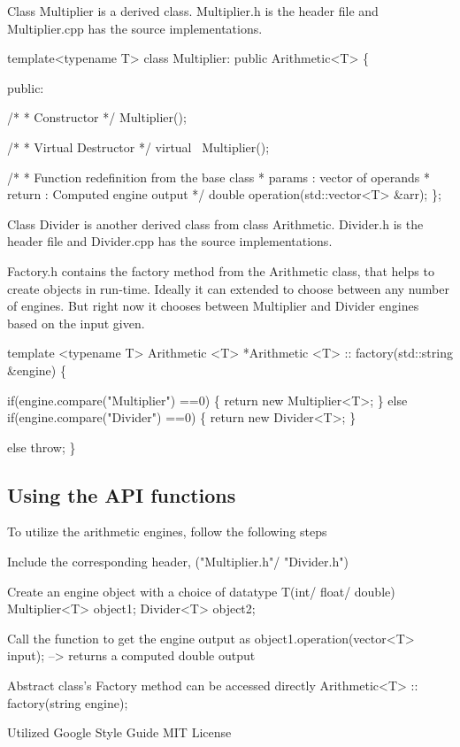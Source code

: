 Class Multiplier is a derived class. Multiplier.\+h is the header file and Multiplier.\+cpp has the source implementations.


\begin{DoxyCode}
template<typename T>
class Multiplier: public Arithmetic<T> \{

public:

    /*
     * Constructor
     */
    Multiplier();

    /*
     * Virtual Destructor
     */
    virtual ~Multiplier();

    /*
     * Function redefinition from the base class
     * params :  vector of operands
     * return :  Computed engine output
     */
    double operation(std::vector<T> &arr);
\};
\end{DoxyCode}


Class Divider is another derived class from class Arithmetic. Divider.\+h is the header file and Divider.\+cpp has the source implementations.

Factory.\+h contains the factory method from the Arithmetic class, that helps to create objects in run-\/time. Ideally it can extended to choose between any number of engines. But right now it chooses between Multiplier and Divider engines based on the input given.


\begin{DoxyCode}
template <typename T>
Arithmetic <T> *Arithmetic <T> :: factory(std::string &engine) \{

    if(engine.compare("Multiplier") ==0) \{
        return new Multiplier<T>;
    \}
    else if(engine.compare("Divider") ==0) \{
        return new Divider<T>;
    \}

    else
        throw;
\}
\end{DoxyCode}


\subsection*{Using the A\+PI functions}

To utilize the arithmetic engines, follow the following steps 
\begin{DoxyCode}
Include the corresponding header, ("Multiplier.h"/ "Divider.h")

Create an engine object with a choice of datatype T(int/ float/ double)
    Multiplier<T> object1;
    Divider<T> object2;

Call the function to get the engine output as
         object1.operation(vector<T> input);  --> returns a computed double output

Abstract class's Factory method can be accessed directly
    Arithmetic<T> :: factory(string engine);        
\end{DoxyCode}



\begin{DoxyCode}
Utilized Google Style Guide
MIT License
\end{DoxyCode}
 